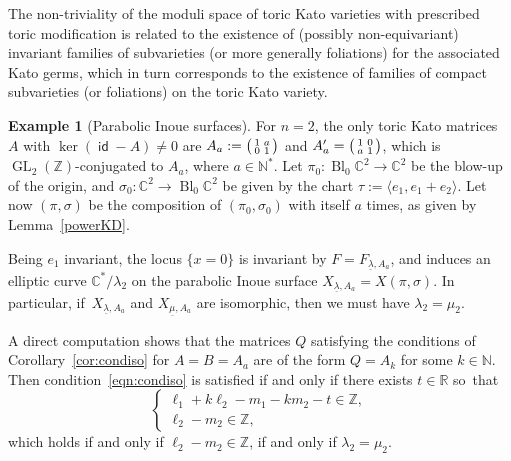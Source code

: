\documentclass[JEP,XML,SOM,Unicode,NoFloatCountersInSection]{cedram}
\newenvironment{smallpmatrix}{\big(\begin{smallmatrix}}{\end{smallmatrix}\big)}
\theoremstyle{definition}
\newtheorem{example}[theorem]{Example}
\let\la\lambda
\let\un\underline
\newcommand{\CC}{\mathbb{C}}
\newcommand{\NN}{\mathbb{N}}
\newcommand{\RR}{\mathbb{R}}
\newcommand{\ZZ}{\mathbb{Z}}
\DeclareMathOperator{\Bl}{Bl}
\DeclareMathOperator{\GL}{GL}
\DeclareMathOperator{\id}{\mathsf{id}}
\begin{document}
The non-triviality of the moduli space of toric Kato varieties with prescribed toric modification is related to the existence of (possibly non-equivariant) invariant families of subvarieties (or more generally foliations) for the associated Kato germs, which in turn corresponds to the existence of families of compact subvarieties (or foliations) on the toric Kato variety.

\begin{example}[Parabolic Inoue surfaces]
For $n=2$, the only toric Kato matrices~$A$ with $\ker(\id-A)\neq 0$ are
$
A_a:=\begin{smallpmatrix}
1 &a\\
0 &1\end{smallpmatrix}
$
and
$A'_a=\begin{smallpmatrix}
1 &0\\
a &1\end{smallpmatrix}$,
which is $\GL_2(\ZZ)$-conjugated to $A_a$, where $a\in\NN^*$.
Let $\pi_0:\Bl_0\CC^2\to\CC^2$ be the blow-up of the origin, and $\sigma_0:\CC^2\to\Bl_0\CC^2$ be given by the chart $\tau:=\langle e_1, e_1+e_2\rangle$. Let now $(\pi,\sigma)$ be the composition of $(\pi_0,\sigma_0)$ with itself $a$ times, as given by Lemma~\ref{powerKD}.

Being $e_1$ invariant, the locus $\{x=0\}$ is invariant by $F=F_{\un\la, A_a}$, and induces an elliptic curve $\CC^*/\lambda_2$ on the parabolic Inoue surface $X_{\un\la, A_a}=X(\pi,\sigma)$.
In particular, if~$X_{\un\la, A_a}$ and $X_{\un\mu, A_a}$ are isomorphic, then we must have $\lambda_2=\mu_2$.

A direct computation shows that the matrices $Q$ satisfying the conditions of Corollary~\ref{cor:condiso} for $A=B=A_a$ are of the form $Q=A_k$ for some $k \in \NN$.
Then condition~\eqref{eqn:condiso} is satisfied if and only if there exists $t \in \RR$ so~that\vspace*{-3pt}
\[
\begin{cases}
\ell_1 + k \ell_2 - m_1 - k m_2 -t \in \ZZ,\\
\ell_2-m_2 \in \ZZ,
\end{cases}
\]
which holds if and only if $\ell_2 - m_2 \in \ZZ$, \ie if and only if $\lambda_2=\mu_2$.
\end{example}
\end{document}
